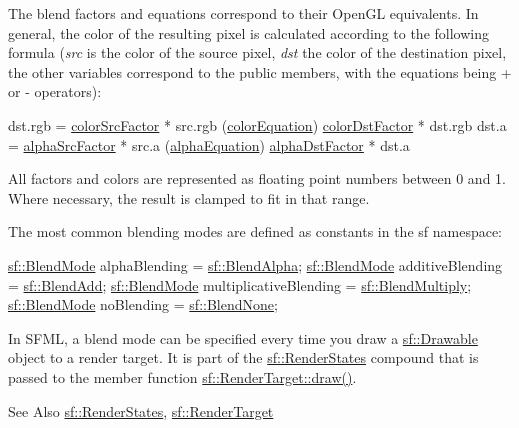 The blend factors and equations correspond to their Open\-G\-L equivalents. In general, the color of the resulting pixel is calculated according to the following formula ({\itshape src} is the color of the source pixel, {\itshape dst} the color of the destination pixel, the other variables correspond to the public members, with the equations being + or -\/ operators)\-: 
\begin{DoxyCode}
dst.rgb = \hyperlink{structsf_1_1_blend_mode_a32d1a55dbfada86a06d9b881dc8ccf7b}{colorSrcFactor} * src.rgb (\hyperlink{structsf_1_1_blend_mode_aed12f06eb7f50a1b95b892b0964857b1}{colorEquation}) 
      \hyperlink{structsf_1_1_blend_mode_adee68ee59e7f1bf71d12db03d251104d}{colorDstFactor} * dst.rgb
dst.a   = \hyperlink{structsf_1_1_blend_mode_aa94e44f8e1042a7357e8eff78c61a1be}{alphaSrcFactor} * src.a   (\hyperlink{structsf_1_1_blend_mode_a68f5a305e0912946f39ba6c9265710c4}{alphaEquation}) 
      \hyperlink{structsf_1_1_blend_mode_aaf85b6b7943181cc81745569c4851e4e}{alphaDstFactor} * dst.a
\end{DoxyCode}
 All factors and colors are represented as floating point numbers between 0 and 1. Where necessary, the result is clamped to fit in that range.

The most common blending modes are defined as constants in the sf namespace\-:


\begin{DoxyCode}
\hyperlink{structsf_1_1_blend_mode}{sf::BlendMode} alphaBlending          = \hyperlink{namespacesf_a7747d95d2e1f108142ea7c760c0b266c}{sf::BlendAlpha};
\hyperlink{structsf_1_1_blend_mode}{sf::BlendMode} additiveBlending       = \hyperlink{namespacesf_a1be8c314242e6ed161af2aea08be543c}{sf::BlendAdd};
\hyperlink{structsf_1_1_blend_mode}{sf::BlendMode} multiplicativeBlending = \hyperlink{namespacesf_ad8622674d06322d447de6ea0c95c83b4}{sf::BlendMultiply};
\hyperlink{structsf_1_1_blend_mode}{sf::BlendMode} noBlending             = \hyperlink{namespacesf_aaa5511bd6fcf3573d61945b6d70a20ab}{sf::BlendNone};
\end{DoxyCode}


In S\-F\-M\-L, a blend mode can be specified every time you draw a \hyperlink{classsf_1_1_drawable}{sf\-::\-Drawable} object to a render target. It is part of the \hyperlink{classsf_1_1_render_states}{sf\-::\-Render\-States} compound that is passed to the member function \hyperlink{classsf_1_1_render_target_a12417a3bcc245c41d957b29583556f39}{sf\-::\-Render\-Target\-::draw()}.

\begin{DoxySeeAlso}{See Also}
\hyperlink{classsf_1_1_render_states}{sf\-::\-Render\-States}, \hyperlink{classsf_1_1_render_target}{sf\-::\-Render\-Target} 
\end{DoxySeeAlso}


